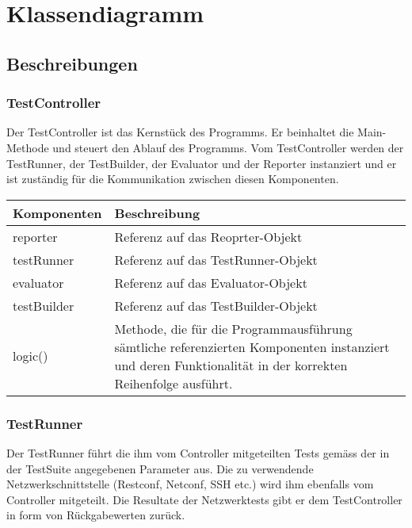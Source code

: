 \documentclass[
	ngerman,
	toc=listof, %
	toc=bibliography, %
	footnotes=multiple, %
	parskip=half, %
	numbers=noendperiod %
]{scrartcl}
\begin{document}
\section{Klassendiagramm}

	\subsection{Beschreibungen}

	\subsubsection{TestController}
	Der TestController ist das Kernstück des Programms. 
	Er beinhaltet die Main-Methode und steuert den Ablauf des Programms. 
	Vom TestController werden der TestRunner, der TestBuilder, der Evaluator und der Reporter instanziert und er ist zuständig für die Kommunikation zwischen diesen Komponenten.
	
	\begin{tabularx}{\textwidth}{lX}
		\toprule
			Komponenten & Beschreibung \\
		\midrule
			reporter & Referenz auf das Reoprter-Objekt \\
			testRunner & Referenz auf das TestRunner-Objekt \\
			evaluator & Referenz auf das Evaluator-Objekt \\
			testBuilder & Referenz auf das TestBuilder-Objekt \\
		\midrule
			logic() & Methode, die für die Programmausführung sämtliche referenzierten Komponenten instanziert und deren Funktionalität in der korrekten Reihenfolge ausführt.\\
		\bottomrule
	\end{tabularx}

	\subsubsection{TestRunner}
	Der TestRunner führt die ihm vom Controller mitgeteilten Tests gemäss der in der TestSuite angegebenen Parameter aus. 
	Die zu verwendende Netzwerkschnittstelle (Restconf, Netconf, SSH etc.) wird ihm ebenfalls vom Controller mitgeteilt.
	Die Resultate der Netzwerktests gibt er dem TestController in form von Rückgabewerten zurück.
\end{document}
